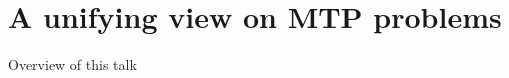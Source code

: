 \documentclass[]{beamer}
\begin{document}
\section{A unifying view on MTP problems}


\begin{frame}{Overview of this talk}

\tableofcontents

\end{frame}

%
%
%
%
%
%
%
%
%
%
%
\end{document}
